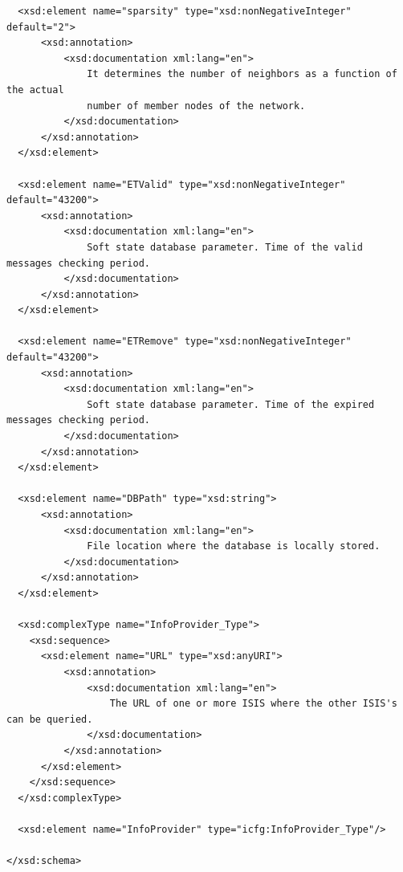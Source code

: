 \documentclass{book}
\begin{document}
\begin{verbatim}
  <xsd:element name="sparsity" type="xsd:nonNegativeInteger" default="2">
      <xsd:annotation>
          <xsd:documentation xml:lang="en">
              It determines the number of neighbors as a function of the actual 
              number of member nodes of the network.
          </xsd:documentation>
      </xsd:annotation>
  </xsd:element>

  <xsd:element name="ETValid" type="xsd:nonNegativeInteger" default="43200">
      <xsd:annotation>
          <xsd:documentation xml:lang="en">
              Soft state database parameter. Time of the valid messages checking period.
          </xsd:documentation>
      </xsd:annotation>
  </xsd:element>

  <xsd:element name="ETRemove" type="xsd:nonNegativeInteger" default="43200">
      <xsd:annotation>
          <xsd:documentation xml:lang="en">
              Soft state database parameter. Time of the expired messages checking period.
          </xsd:documentation>
      </xsd:annotation>
  </xsd:element>

  <xsd:element name="DBPath" type="xsd:string">
      <xsd:annotation>
          <xsd:documentation xml:lang="en">
              File location where the database is locally stored.
          </xsd:documentation>
      </xsd:annotation>
  </xsd:element>

  <xsd:complexType name="InfoProvider_Type">
    <xsd:sequence>
      <xsd:element name="URL" type="xsd:anyURI">
          <xsd:annotation>
              <xsd:documentation xml:lang="en">
                  The URL of one or more ISIS where the other ISIS's can be queried.
              </xsd:documentation>
          </xsd:annotation>
      </xsd:element>
    </xsd:sequence>
  </xsd:complexType>

  <xsd:element name="InfoProvider" type="icfg:InfoProvider_Type"/>

</xsd:schema>

\end{verbatim}

\end{document}
